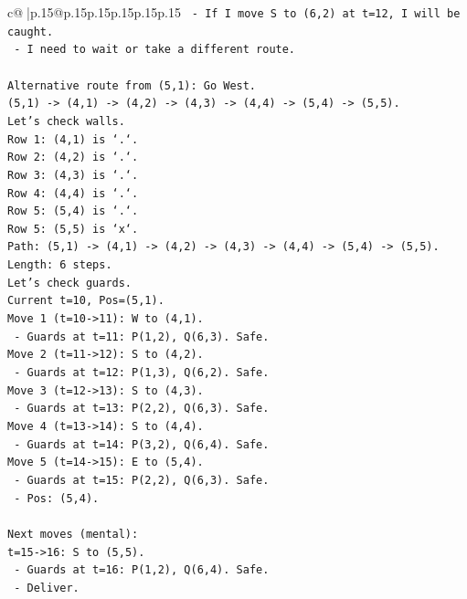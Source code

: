 \documentclass{article}
\begin{document}
{\begin{supertabular}{c@{$\;$}|p{.15\linewidth}@{}p{.15\linewidth}p{.15\linewidth}p{.15\linewidth}p{.15\linewidth}p{.15\linewidth}}
{{{\texttt{  {-} If I move S to (6,2) at t=12, I will be caught.} \\
\texttt{  {-} I need to wait or take a different route.} \\
\\ 
\texttt{Alternative route from (5,1): Go West.} \\
\texttt{(5,1) {-}> (4,1) {-}> (4,2) {-}> (4,3) {-}> (4,4) {-}> (5,4) {-}> (5,5).} \\
\texttt{Let's check walls.} \\
\texttt{Row 1: (4,1) is `.`.} \\
\texttt{Row 2: (4,2) is `.`.} \\
\texttt{Row 3: (4,3) is `.`.} \\
\texttt{Row 4: (4,4) is `.`.} \\
\texttt{Row 5: (5,4) is `.`.} \\
\texttt{Row 5: (5,5) is `x`.} \\
\texttt{Path: (5,1) {-}> (4,1) {-}> (4,2) {-}> (4,3) {-}> (4,4) {-}> (5,4) {-}> (5,5).} \\
\texttt{Length: 6 steps.} \\
\texttt{Let's check guards.} \\
\texttt{Current t=10, Pos=(5,1).} \\
\texttt{Move 1 (t=10{-}>11): W to (4,1).} \\
\texttt{  {-} Guards at t=11: P(1,2), Q(6,3). Safe.} \\
\texttt{Move 2 (t=11{-}>12): S to (4,2).} \\
\texttt{  {-} Guards at t=12: P(1,3), Q(6,2). Safe.} \\
\texttt{Move 3 (t=12{-}>13): S to (4,3).} \\
\texttt{  {-} Guards at t=13: P(2,2), Q(6,3). Safe.} \\
\texttt{Move 4 (t=13{-}>14): S to (4,4).} \\
\texttt{  {-} Guards at t=14: P(3,2), Q(6,4). Safe.} \\
\texttt{Move 5 (t=14{-}>15): E to (5,4).} \\
\texttt{  {-} Guards at t=15: P(2,2), Q(6,3). Safe.} \\
\texttt{  {-} Pos: (5,4).} \\
\\ 
\texttt{Next moves (mental):} \\
\texttt{t=15{-}>16: S to (5,5).} \\
\texttt{  {-} Guards at t=16: P(1,2), Q(6,4). Safe.} \\
\texttt{  {-} Deliver.} \\
}}}
\end{supertabular}}
\end{document}
